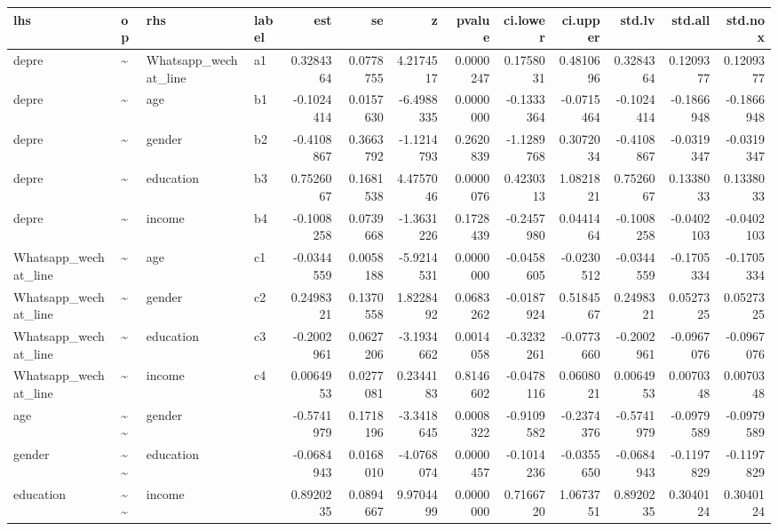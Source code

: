 \documentclass[
]{article}
\begin{document}
\begin{table}[!h]
\centering
\begin{tabular}[t]{llllrrrrrrrrr}
\toprule
lhs & op & rhs & label & est & se & z & pvalue & ci.lower & ci.upper & std.lv & std.all & std.nox\\
\midrule
depre & \textasciitilde{} & Whatsapp\_wechat\_line & a1 & 0.3284364 & 0.0778755 & 4.2174517 & 0.0000247 & 0.1758031 & 0.4810696 & 0.3284364 & 0.1209377 & 0.1209377\\
depre & \textasciitilde{} & age & b1 & -0.1024414 & 0.0157630 & -6.4988335 & 0.0000000 & -0.1333364 & -0.0715464 & -0.1024414 & -0.1866948 & -0.1866948\\
depre & \textasciitilde{} & gender & b2 & -0.4108867 & 0.3663792 & -1.1214793 & 0.2620839 & -1.1289768 & 0.3072034 & -0.4108867 & -0.0319347 & -0.0319347\\
depre & \textasciitilde{} & education & b3 & 0.7526067 & 0.1681538 & 4.4757046 & 0.0000076 & 0.4230313 & 1.0821821 & 0.7526067 & 0.1338033 & 0.1338033\\
depre & \textasciitilde{} & income & b4 & -0.1008258 & 0.0739668 & -1.3631226 & 0.1728439 & -0.2457980 & 0.0441464 & -0.1008258 & -0.0402103 & -0.0402103\\
\addlinespace
Whatsapp\_wechat\_line & \textasciitilde{} & age & c1 & -0.0344559 & 0.0058188 & -5.9214531 & 0.0000000 & -0.0458605 & -0.0230512 & -0.0344559 & -0.1705334 & -0.1705334\\
Whatsapp\_wechat\_line & \textasciitilde{} & gender & c2 & 0.2498321 & 0.1370558 & 1.8228492 & 0.0683262 & -0.0187924 & 0.5184567 & 0.2498321 & 0.0527325 & 0.0527325\\
Whatsapp\_wechat\_line & \textasciitilde{} & education & c3 & -0.2002961 & 0.0627206 & -3.1934662 & 0.0014058 & -0.3232261 & -0.0773660 & -0.2002961 & -0.0967076 & -0.0967076\\
Whatsapp\_wechat\_line & \textasciitilde{} & income & c4 & 0.0064953 & 0.0277081 & 0.2344183 & 0.8146602 & -0.0478116 & 0.0608021 & 0.0064953 & 0.0070348 & 0.0070348\\
age & \textasciitilde{}\textasciitilde{} & gender &  & -0.5741979 & 0.1718196 & -3.3418645 & 0.0008322 & -0.9109582 & -0.2374376 & -0.5741979 & -0.0979589 & -0.0979589\\
\addlinespace
gender & \textasciitilde{}\textasciitilde{} & education &  & -0.0684943 & 0.0168010 & -4.0768074 & 0.0000457 & -0.1014236 & -0.0355650 & -0.0684943 & -0.1197829 & -0.1197829\\
education & \textasciitilde{}\textasciitilde{} & income &  & 0.8920235 & 0.0894667 & 9.9704499 & 0.0000000 & 0.7166720 & 1.0673751 & 0.8920235 & 0.3040124 & 0.3040124\\

\end{tabular}
\end{table}
\end{document}
